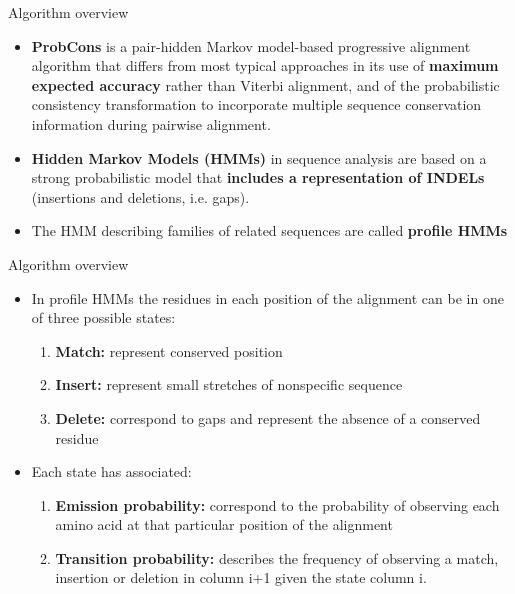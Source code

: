 \begin{frame}{Algorithm overview}
    \begin{itemize}
        \item \textbf{ProbCons\cite{do2005probcons}} is a pair-hidden Markov model-based progressive alignment algorithm that differs from most typical approaches in its use of \textbf{maximum expected accuracy} rather than Viterbi alignment, and of the probabilistic consistency transformation to incorporate multiple sequence conservation information during pairwise alignment. 
        \item \textbf{Hidden Markov Models (HMMs)} in sequence analysis are based on a strong probabilistic model that \textbf{includes a representation of INDELs} (insertions and deletions, i.e. gaps). 
        \item The HMM describing families of related sequences are called \textbf{profile HMMs}
    \end{itemize}
\end{frame}

\begin{frame}{Algorithm overview}
    \begin{itemize}
        \item In profile HMMs the residues in each position of the alignment can be in one of three possible states:
        \begin{enumerate}
            \item \textbf{Match:} represent conserved position
            \item \textbf{Insert:} represent small stretches of nonspecific sequence
            \item \textbf{Delete:} correspond to gaps and represent the absence of a conserved residue
        \end{enumerate}
        \item Each state has associated:
        \begin{enumerate}
            \item \textbf{Emission probability:} correspond to the probability of observing each amino acid at that particular position of the alignment
            \item \textbf{Transition probability:} describes the frequency of observing a match, insertion or deletion in column i+1 given the state column i. 
        \end{enumerate}
    \end{itemize}
    
\end{frame}

